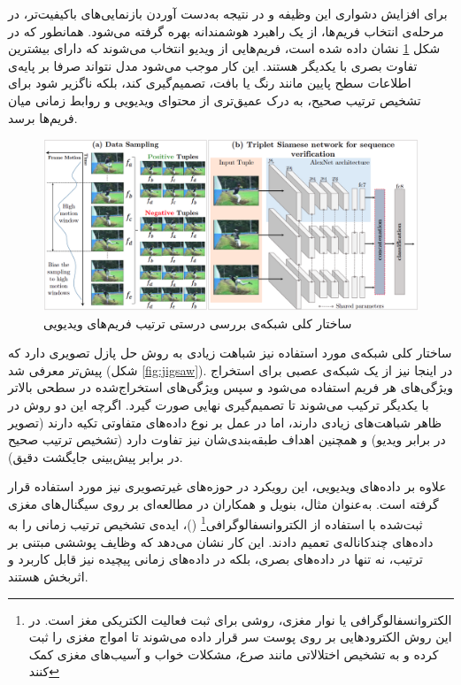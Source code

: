 برای افزایش دشواری این وظیفه و در نتیجه به‌دست آوردن بازنمایی‌های باکیفیت‌تر، در مرحله‌ی انتخاب فریم‌ها، از یک راهبرد هوشمندانه بهره گرفته می‌شود. همانطور که در شکل \ref{fig:video-permutation} نشان داده شده است، فریم‌هایی از ویدیو انتخاب می‌شوند که دارای بیشترین تفاوت‌ بصری با یکدیگر هستند. این کار موجب می‌شود مدل نتواند صرفا بر پایه‌ی اطلاعات سطح پایین مانند رنگ یا بافت، تصمیم‌گیری کند، بلکه ناگزیر شود برای تشخیص ترتیب صحیح، به درک عمیق‌تری از محتوای ویدیویی و روابط زمانی میان فریم‌ها برسد.

\begin{figure}[htbp]
\centering
\includegraphics[width=1\textwidth]{Images/Chapter2/video-permutation.png}
\caption{ساختار کلی شبکه‌ی بررسی درستی ترتیب فریم‌های ویدیویی}
\label{fig:video-permutation}
\end{figure}

ساختار کلی شبکه‌ی مورد استفاده نیز شباهت زیادی به روش حل پازل تصویری دارد که پیش‌تر معرفی شد (شکل \ref{fig:jigsaw}). در اینجا نیز از یک شبکه‌ی عصبی برای استخراج ویژگی‌های هر فریم استفاده می‌شود و سپس ویژگی‌های استخراج‌شده در سطحی بالاتر با یکدیگر ترکیب می‌شوند تا تصمیم‌گیری نهایی صورت گیرد. اگرچه این دو روش در ظاهر شباهت‌های زیادی دارند، اما در عمل بر نوع داده‌های متفاوتی تکیه دارند (تصویر در برابر ویدیو) و همچنین اهداف طبقه‌بندی‌شان نیز تفاوت دارد (تشخیص ترتیب صحیح در برابر پیش‌بینی جایگشت دقیق).

علاوه بر داده‌های ویدیویی، این رویکرد در حوزه‌های غیرتصویری نیز مورد استفاده قرار گرفته است. به‌عنوان مثال، بنویل و همکاران \cite{banville2019self} در مطالعه‌ای بر روی سیگنال‌های مغزی ثبت‌شده با استفاده از الکتروانسفالوگرافی\footnote{الکتروانسفالوگرافی یا نوار مغزی، روشی برای ثبت فعالیت الکتریکی مغز است. در این روش الکترودهایی بر روی پوست سر قرار داده می‌شوند تا امواج مغزی را ثبت کرده و به تشخیص اختلالاتی مانند صرع، مشکلات خواب و آسیب‌های مغزی کمک کنند} ()،
ایده‌ی تشخیص ترتیب زمانی را به داده‌های چندکاناله‌ی  تعمیم دادند. این کار نشان می‌دهد که وظایف پوششی مبتنی بر ترتیب، نه تنها در داده‌های بصری، بلکه در داده‌های زمانی پیچیده نیز قابل کاربرد و اثربخش هستند.

